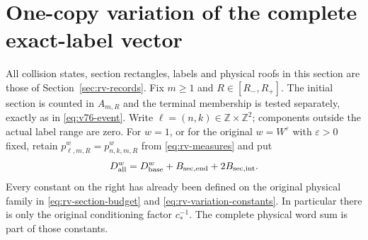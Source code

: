 \section{One-copy variation of the complete exact-label vector}
\label{sec:av-all-labels}

All collision states, section rectangles, labels and physical roofs in this
section are those of Section~\ref{sec:rv-records}.  Fix $m\ge1$ and
$R\in[R_-,R_+]$.  The initial section is counted in $A_{m,R}$ and
the terminal membership is tested separately, exactly as in
\eqref{eq:v76-event}.  Write $\ell=(n,k)\in\mathbb Z\times\mathbb Z^2$;
components outside the actual label range are zero.  For $w=1$, or for
the original $w=W^\varepsilon$ with $\varepsilon>0$ fixed, retain
$p^w_{\ell,m,R}=p^w_{n,k,m,R}$ from \eqref{eq:rv-measures} and put
\begin{equation}\label{eq:av-all-constant}
 D_{\rm all}^w=D_{\rm base}^w+B_{\rm sec,end}+2B_{\rm sec,int}.
\end{equation}
Every constant on the right has already been defined on the original
physical family in \eqref{eq:rv-section-budget} and
\eqref{eq:rv-variation-constants}.  In particular there is only the
original conditioning factor $c_*^{-1}$.  The complete physical word
sum is part of those constants.

